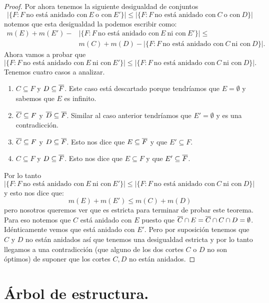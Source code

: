 \documentclass[tesis.tex]{subfiles}
\begin{document}
\begin{proof}
	Por ahora tenemos la siguiente desigualdad de conjuntos
	\[
		|\{ F : F \ \text{no está anidado con} \ E \ \text{o con} \  E' \}| \le |\{ F : F \  \text{no está anidado con} \ C \ \text{o con} \ D \}|
	\]
	notemos que esta desigualdad la podemos escribir como:
	\begin{align*}
		m(E) + m(E') - &|\{ F : F \ \text{no está anidado con} \ E \ \text{ni con} \ E' \}| \le \\
		&m(C) + m(D) - |\{ F : F \ \text{no está anidado con} \ C \ \text{ni con} \ D \}|.
	\end{align*}
	Ahora vamos a probar que 
	\[
		|\{ F : F \ \text{no está anidado con} \ E \ \text{ni con} \ E' \}| \le |\{ F : F \ \text{no está anidado con} \ C \ \text{ni con} \ D \}|.
	\]
	Tenemos cuatro casos a analizar.
	\begin{enumerate}
		\item $C \subseteq F$ y $D \subseteq \overline F$.
		Este caso está descartado porque tendríamos que $E=\emptyset$ y sabemos que $E$ es infinito. 
		\item $\overline C \subseteq F$ y $\overline D \subseteq \overline F$.
		Similar al caso anterior tendríamos que $E' = \emptyset$ y es una contradicción.
		\item $\overline C \subseteq F$ y $D \subseteq \overline F$.
		Esto nos dice que $E \subseteq \overline F$ y que $E' \subseteq F$.
		\item $ C \subseteq F$ y $D \subseteq \overline F$.
		Esto nos dice que $E \subseteq F$ y que $E' \subseteq \overline F$.
	\end{enumerate}
	Por lo tanto $|\{ F : F \ \text{no está anidado con} \ E \ \text{ni con} \ E' \}| \le |\{ F : F \ \text{no está anidado con} \ C \ \text{ni con} \ D \}|$ y esto nos dice que:
	\[
		m(E) + m(E') \le m(C) + m(D)
	\]
	pero nosotros queremos ver que es estricta para terminar de probar este teorema.
	Para eso notemos que $C$ está anidado con $E$ puesto que $\overline C \cap E = \overline C \cap C \cap D = \emptyset$.
	Idénticamente vemos que está anidado con $E'$.
	Pero por suposición tenemos que $C$ y $D$ no están anidados así que tenemos una desigualdad estricta y por lo tanto llegamos a una contradicción (que alguno de los dos cortes $C$ o $D$ no son óptimos) de suponer que los cortes $C,D$ no están anidados.
\end{proof}

\section{Árbol de estructura.}\label{secc_arbol_estr}
\end{document}
